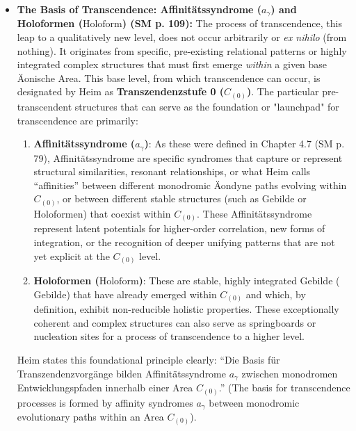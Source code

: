 \documentclass[12pt]{article}
\newcommand{\q}[1]{\enquote{#1}}
\newcommand{\conceptualsyndrome}{a}
\newcommand{\syntrometrischesGebilde}{\text{Gebilde}}
\newcommand{\holoform}{\text{Holoform}}
\begin{document}
\begin{itemize}
    \item \textbf{The Basis of Transcendence: Affinitätssyndrome (\(\conceptualsyndrome_\gamma\)) and Holoformen (\(\holoform\)) (SM p. 109):}
    The process of transcendence, this leap to a qualitatively new level, does not occur arbitrarily or \textit{ex nihilo} (from nothing). It originates from specific, pre-existing relational patterns or highly integrated complex structures that must first emerge \textit{within} a given base Äonische Area. This base level, from which transcendence can occur, is designated by Heim as \textbf{Transzendenzstufe 0 (\( C_{(0)} \))}. The particular pre-transcendent structures that can serve as the foundation or "launchpad" for transcendence are primarily:
    \begin{enumerate}
        \item \textbf{Affinitätssyndrome (\( a_\gamma \))}: As these were defined in Chapter 4.7 (SM p. 79), Affinitätssyndrome are specific syndromes that capture or represent structural similarities, resonant relationships, or what Heim calls \q{affinities} between different monodromic Äondyne paths evolving within \( C_{(0)} \), or between different stable structures (such as Gebilde or Holoformen) that coexist within \( C_{(0)} \). These Affinitätssyndrome represent latent potentials for higher-order correlation, new forms of integration, or the recognition of deeper unifying patterns that are not yet explicit at the \( C_{(0)} \) level.
        \item \textbf{Holoformen (\(\holoform\))}: These are stable, highly integrated Gebilde (\(\syntrometrischesGebilde\)) that have already emerged within \( C_{(0)} \) and which, by definition, exhibit non-reducible holistic properties. These exceptionally coherent and complex structures can also serve as springboards or nucleation sites for a process of transcendence to a higher level.
    \end{enumerate}
    Heim states this foundational principle clearly: \q{Die Basis für Transzendenzvorgänge bilden Affinitätssyndrome \( a_\gamma \) zwischen monodromen Entwicklungspfaden innerhalb einer Area \( C_{(0)} \).} (The basis for transcendence processes is formed by affinity syndromes \( a_\gamma \) between monodromic evolutionary paths within an Area \( C_{(0)} \)).


\end{itemize}
\end{document}
